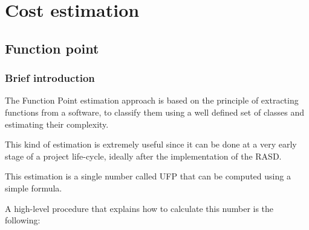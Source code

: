 \chapter{Cost estimation}

\section{Function point}

\subsection{Brief introduction}
The Function Point estimation approach is based on the principle of extracting functions from a software, to classify them using a well defined set of classes and estimating their complexity.

This kind of estimation is extremely useful since it can be done at a very early stage of a project life-cycle, ideally after the implementation of the RASD.

This estimation is a single number called UFP that can be computed using a simple formula.

A high-level procedure that explains how to calculate this number is the following:

